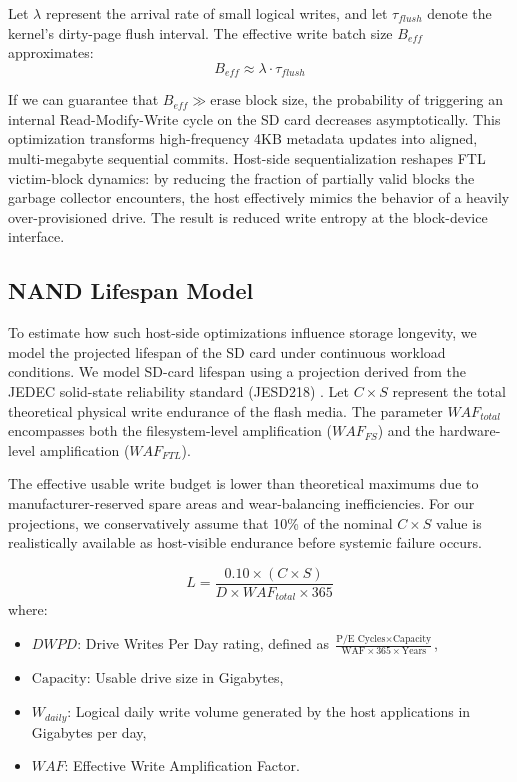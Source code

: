 \documentclass[conference]{IEEEtran}
\begin{document}
Let $\lambda$ represent the arrival rate of small logical writes, and let $\tau_{flush}$ denote the kernel’s dirty-page flush interval. The effective write batch size $B_{eff}$ approximates:
\begin{equation}
B_{eff} \approx \lambda \cdot \tau_{flush}
\end{equation}

If we can guarantee that $B_{eff} \gg \text{erase block size}$, the probability of triggering an internal Read-Modify-Write cycle on the SD card decreases asymptotically. This optimization transforms high-frequency 4KB metadata updates into aligned, multi-megabyte sequential commits. Host-side sequentialization reshapes FTL victim-block dynamics: by reducing the fraction of partially valid blocks the garbage collector encounters, the host effectively mimics the behavior of a heavily over-provisioned drive. The result is reduced write entropy at the block-device interface.

\subsection{NAND Lifespan Model}
To estimate how such host-side optimizations influence storage longevity, we model the projected lifespan of the SD card under continuous workload conditions. We model SD-card lifespan using a projection derived from the JEDEC solid-state reliability standard (JESD218) \cite{b12}. Let $C \times S$ represent the total theoretical physical write endurance of the flash media. The parameter $WAF_{total}$ encompasses both the filesystem-level amplification ($WAF_{FS}$) and the hardware-level amplification ($WAF_{FTL}$). 

The effective usable write budget is lower than theoretical maximums due to manufacturer-reserved spare areas and wear-balancing inefficiencies. For our projections, we conservatively assume that 10\% of the nominal $C \times S$ value is realistically available as host-visible endurance before systemic failure occurs.

\begin{equation}
L = \frac{0.10 \times (C \times S)}{D \times WAF_{total} \times 365}
\label{eq:lifespan}
\end{equation}
where:
\begin{itemize}
    \item $DWPD$: Drive Writes Per Day rating, defined as $\frac{\text{P/E Cycles} \times \text{Capacity}}{\text{WAF} \times 365 \times \text{Years}}$,
    \item $\text{Capacity}$: Usable drive size in Gigabytes,
    \item $W_{daily}$: Logical daily write volume generated by the host applications in Gigabytes per day,
    \item $WAF$: Effective Write Amplification Factor.
\end{itemize}
\end{document}
